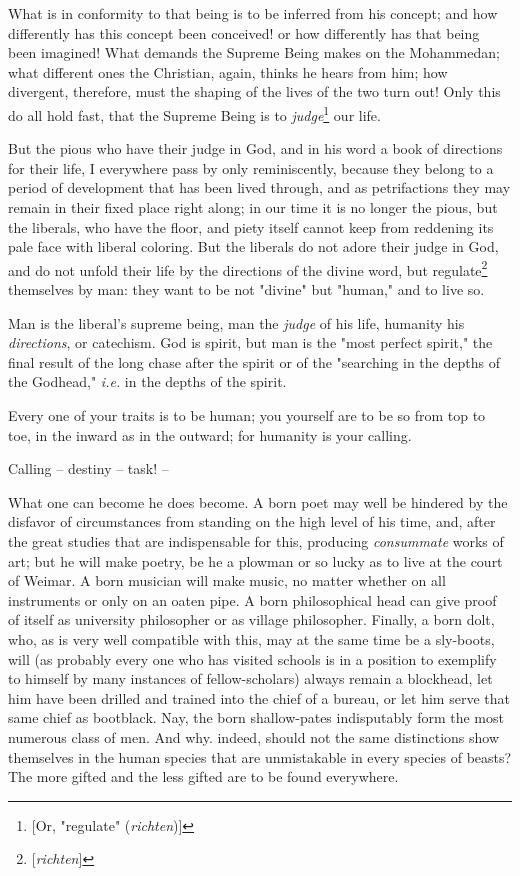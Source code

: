 \documentclass[a4paper]{book}
\begin{document}
What is in conformity to that being is to be inferred from his concept; and 
how differently has this concept been conceived! or how differently has that 
being been imagined! What demands the Supreme Being makes on the Mohammedan; 
what different ones the Christian, again, thinks he hears from him; how 
divergent, therefore, must the shaping of the lives of the two turn out! Only 
this do all hold fast, that the Supreme Being is to 
\textit{judge}\footnote{[Or, "{}regulate"{} (\textit{richten})]} our life.

But the pious who have their judge in God, and in his word a book of 
directions for their life, I everywhere pass by only reminiscently, because 
they belong to a period of development that has been lived through, and as 
petrifactions they may remain in their fixed place right along; in our time it 
is no longer the pious, but the liberals, who have the floor, and piety itself 
cannot keep from reddening its pale face with liberal coloring. But the 
liberals do not adore their judge in God, and do not unfold their life by the 
directions of the divine word, but regulate\footnote{[\textit{richten}]} 
themselves by man: they want to be not "{}divine"{} but "{}human,"{} and to 
live so.

Man is the liberal's supreme being, man the \textit{judge} of his life, 
humanity his \textit{directions}, or catechism. God is spirit, but man is the 
"{}most perfect spirit,"{} the final result of the long chase after the spirit 
or of the "{}searching in the depths of the Godhead,"{} \textit{i.e.} in the 
depths of the spirit.

Every one of your traits is to be human; you yourself are to be so from top to 
toe, in the inward as in the outward; for humanity is your calling.

Calling -- destiny -- task! --

What one can become he does become. A born poet may well be hindered by the 
disfavor of circumstances from standing on the high level of his time, and, 
after the great studies that are indispensable for this, producing 
\textit{consummate} works of art; but he will make poetry, be he a plowman or 
so lucky as to live at the court of Weimar. A born musician will make music, 
no matter whether on all instruments or only on an oaten pipe. A born 
philosophical head can give proof of itself as university philosopher or as 
village philosopher. Finally, a born dolt, who, as is very well compatible 
with this, may at the same time be a sly-boots, will (as probably every one 
who has visited schools is in a position to exemplify to himself by many 
instances of fellow-scholars) always remain a blockhead, let him have been 
drilled and trained into the chief of a bureau, or let him serve that same 
chief as bootblack. Nay, the born shallow-pates indisputably form the most 
numerous class of men. And why. indeed, should not the same distinctions show 
themselves in the human species that are unmistakable in every species of 
beasts? The more gifted and the less gifted are to be found everywhere.
\end{document}
